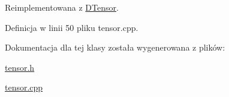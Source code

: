 Reimplementowana z \hyperlink{class_d_tensor_a0ed66ce3f3ab159c4d7f6a019bfea9da}{D\+Tensor}.



Definicja w linii 50 pliku tensor.\+cpp.



Dokumentacja dla tej klasy została wygenerowana z plików\+:\begin{DoxyCompactItemize}
\item 
\hyperlink{tensor_8h}{tensor.\+h}\item 
\hyperlink{tensor_8cpp}{tensor.\+cpp}\end{DoxyCompactItemize}
